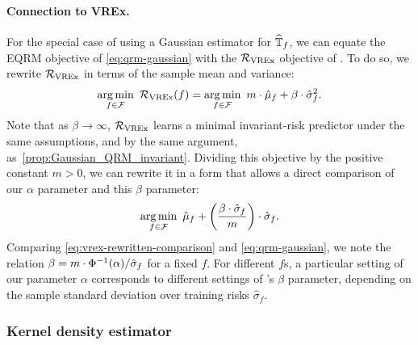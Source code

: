 \documentclass{article}
\begin{document}
\paragraph{Connection to VREx.} For the special case of using a Gaussian estimator for $\widehat{\mathbb{T}}_f$, we can equate the EQRM objective of \eqref{eq:qrm-gaussian} with the $\mathcal{R}_{\operatorname{VREx}}$ objective of \cite[Eq.~8]{krueger21rex}. To do so, we rewrite $\mathcal{R}_{\operatorname{VREx}}$ in terms of the sample mean and variance:
%
\begin{align}\label{eq:vrex-rewritten}
    \operatorname*{arg\,min}_{f\in\mathcal{F}}\ \mathcal{R}_{\operatorname{VREx}}(f) = \operatorname*{arg\,min}_{f\in\mathcal{F}}\ m \cdot \hat{\mu}_f + \beta \cdot \hat{\sigma}^2_f.
\end{align}
%
Note that as $\beta \to \infty$, $\mathcal{R}_{\operatorname{VREx}}$ learns a minimal invariant-risk predictor
%
under the same assumptions, and by the same argument, as~\cref{prop:Gaussian_QRM_invariant}. Dividing this objective by the positive constant $m>0$, we can rewrite it in a form that allows a direct comparison of our $\alpha$ parameter and this $\beta$ parameter:
%
\begin{align}\label{eq:vrex-rewritten-comparison}
    \operatorname*{arg\,min}_{f\in\mathcal{F}}\ \hat{\mu}_f + \left(\frac{\beta \cdot \hat{\sigma}_f}{m}\right) \cdot \hat{\sigma}_f.
\end{align}
%
Comparing \eqref{eq:vrex-rewritten-comparison} and \eqref{eq:qrm-gaussian}, we note the relation $\beta = m \cdot \Phi^{-1}(\alpha) / \hat{\sigma}_f$ for a fixed $f$. For different $f$s, a particular setting of our parameter $\alpha$ corresponds to different settings of \citeauthor{krueger21rex}'s $\beta$ parameter, depending on the sample standard deviation over training risks $\hat{\sigma}_f$.



%


\subsubsection{Kernel density estimator}
\label{app:causality:discovery:kde}
%

%
%
%
%
%
%
%
%
%
%
%
%
%
%
%
%
%
%
%
%
%
%
%
%
%
%
%
%
%
%
%
%
%
%
%
%
%
%
%
%
%
%
%
%
%
%
%
%
%
%
%
%
%
%
%
%
%
%
%
%
%
%
%
%
%
%
%
%
%
%
%
%
%
\end{document}
